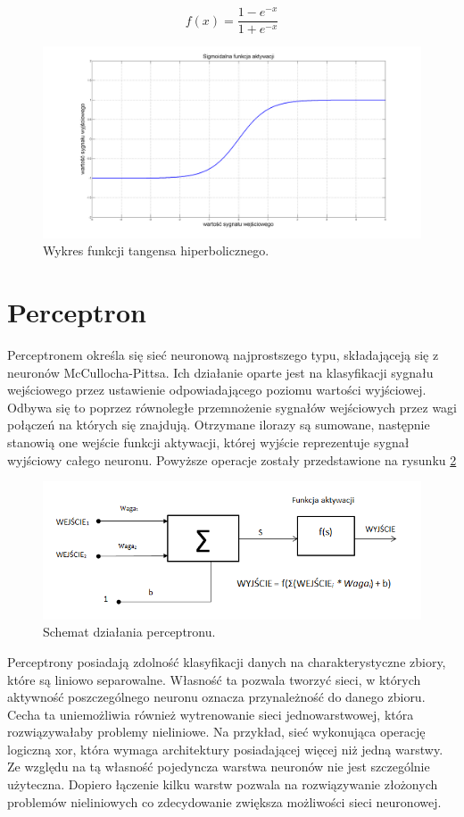 $$ 
f(x) = \frac{1 - e^{-x}}{1 + e^{-x}}
$$

\begin{figure}[!htbp]
\centering
\includegraphics[width=1\linewidth]{./include/tanh}
\caption{Wykres funkcji tangensa hiperbolicznego.}
\label{fig:tanh}
\end{figure}

\section{Perceptron}
Perceptronem określa się sieć neuronową najprostszego typu, składająceją się z neuronów McCullocha-Pittsa. Ich działanie oparte jest na klasyfikacji sygnału wejściowego przez ustawienie odpowiadającego poziomu wartości wyjściowej. 
Odbywa się to poprzez równoległe przemnożenie sygnałów wejściowych przez wagi połączeń na których się znajdują. Otrzymane ilorazy są sumowane, następnie stanowią one wejście funkcji aktywacji, której wyjście reprezentuje sygnał wyjściowy całego neuronu. Powyższe operacje zostały przedstawione na rysunku \ref{fig:flow}

\begin{figure}[!htbp]
\centering
\includegraphics[width=1\linewidth]{./include/flow}
\caption{Schemat działania perceptronu.}
\label{fig:flow}
\end{figure}
 
 
Perceptrony posiadają zdolność klasyfikacji danych na charakterystyczne zbiory, które są liniowo separowalne. Własność ta pozwala tworzyć sieci, w których aktywność poszczególnego neuronu oznacza przynależność do danego zbioru. Cecha ta uniemożliwia również wytrenowanie sieci jednowarstwowej, która rozwiązywałaby problemy nieliniowe. Na przykład, sieć wykonująca operację logiczną xor, która wymaga architektury posiadającej więcej niż jedną warstwy. 
Ze względu na tą własność pojedyncza warstwa neuronów nie jest szczególnie użyteczna. Dopiero łączenie kilku warstw pozwala na rozwiązywanie złożonych problemów nieliniowych co zdecydowanie zwiększa możliwości sieci neuronowej. 


